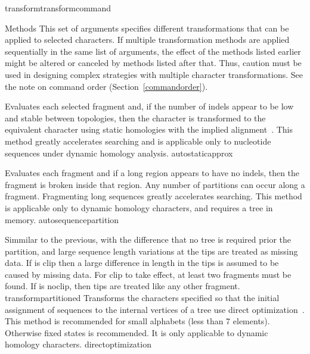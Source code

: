 \begin{command}{transform}{transformcommand}
\begin{arguments}
        \begin{argumentgroup}{Methods}
            This set of arguments specifies different transformations that can be applied
            to selected characters. If multiple transformation methods are applied
            sequentially in the same list of arguments, the effect of the methods listed
            earlier might be altered or canceled by methods listed after that. Thus, caution
            must be used in designing complex strategies with multiple character
            transformations. See the note on command order (Section~\ref{commandorder}).

            {Evaluates each selected fragment and, if the number of indels
            appear to be low and stable between topologies, then the character
            is transformed to the equivalent character using static homologies
            with the implied alignment~\cite{wheeler2003}.
            This method greatly accelerates searching and is applicable only to nucleotide sequences under dynamic homology analysis.}
            {autostaticapprox}

            {Evaluates each fragment and if a long region appears 
            to have no indels, then the fragment is broken inside that region.
            Any number of partitions can occur along a fragment. Fragmenting
            long sequences greatly accelerates searching. This method is
            applicable only to dynamic homology characters, and requires a tree
            in memory.}
            {autosequencepartition}
            
            {Simmilar to the previous, with the difference that no tree is
            required prior the partition, and large sequence length variations
            at the tips are treated as missing data. If \poylident is clip then
            a large difference in length in the tips is assumed to be caused by
            missing data. For clip to take effect, at least two fragments must
            be found. If \poylident is noclip, then tips are treated like
            any other fragment.}
            {transformpartitioned}
          {Transforms the characters specified so that the initial assignment of sequences to 
          the internal vertices of a tree use direct
          optimization~\cite{wheeler1996}. This method is recommended for small
          alphabets (less than 7 elements). Otherwise fixed states is
          recommended. It is only applicable to dynamic homology
          characters.}
          {directoptimization}


\end{argumentgroup}
\end{arguments}
\end{command}
